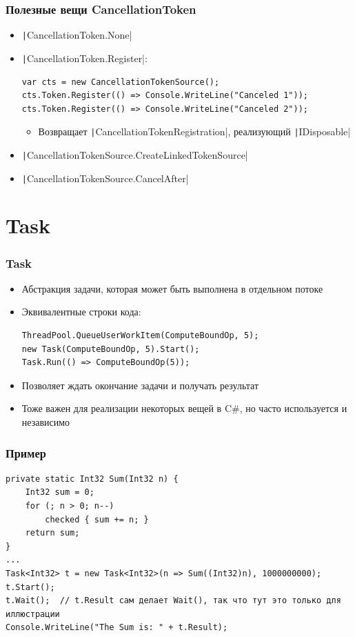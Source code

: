\documentclass[xetex,mathserif,serif]{beamer}
\begin{document}
	\begin{frame}[fragile]
		\frametitle{Полезные вещи CancellationToken}
		\begin{itemize}
			\item \texttt|CancellationToken.None|
			\item \texttt|CancellationToken.Register|:
				\begin{verbatim}
var cts = new CancellationTokenSource();
cts.Token.Register(() => Console.WriteLine("Canceled 1"));
cts.Token.Register(() => Console.WriteLine("Canceled 2"));
				\end{verbatim}
				\begin{itemize}
					\item Возвращает \texttt|CancellationTokenRegistration|, реализующий \texttt|IDisposable|
				\end{itemize}
			\item \texttt|CancellationTokenSource.CreateLinkedTokenSource|
			\item \texttt|CancellationTokenSource.CancelAfter|
		\end{itemize}
	\end{frame}

	\section{Task}

	\begin{frame}[fragile]
		\frametitle{Task}
		\begin{itemize}
			\item Абстракция задачи, которая может быть выполнена в отдельном потоке
			\item Эквивалентные строки кода:
				\begin{verbatim}
ThreadPool.QueueUserWorkItem(ComputeBoundOp, 5);
new Task(ComputeBoundOp, 5).Start();
Task.Run(() => ComputeBoundOp(5));
				\end{verbatim}
			\item Позволяет ждать окончание задачи и получать результат
			\item Тоже важен для реализации некоторых вещей в C\#, но часто используется и независимо
		\end{itemize}
	\end{frame}

	\begin{frame}[fragile]
		\frametitle{Пример}
		\begin{footnotesize}
			\begin{verbatim}
private static Int32 Sum(Int32 n) {
    Int32 sum = 0;
    for (; n > 0; n--)
        checked { sum += n; } 
    return sum;
}
...
Task<Int32> t = new Task<Int32>(n => Sum((Int32)n), 1000000000);
t.Start();
t.Wait();  // t.Result сам делает Wait(), так что тут это только для иллюстрации
Console.WriteLine("The Sum is: " + t.Result);
			\end{verbatim}
		\end{footnotesize}
	\end{frame}
\end{document}
